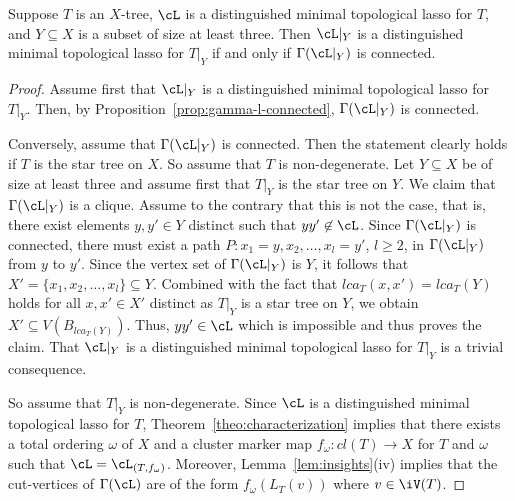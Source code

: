 \begin{thm}
  \label{theo:subtree}
  Suppose $T$ is an $X$-tree, $\cL$ is a distinguished minimal topological
  lasso for $T$, and $Y\subseteq X$ is a subset of size at least three. Then
  $\cL|_Y$ is a distinguished minimal topological lasso for $T|_Y$ if and only
  if $\Gamma(\cL|_Y)$ is connected.
\end{thm}
\begin{proof}
  Assume first that $\cL|_Y$ is a distinguished minimal topological lasso for
  $T|_Y$. Then, by Proposition~\ref{prop:gamma-l-connected}, $\Gamma(\cL|_Y)$
  is connected.

  Conversely, assume that $\Gamma(\cL|_Y)$ is connected. Then the statement
  clearly holds if $T$ is the star tree on $X$. So assume that $T$ is
  non-degenerate. Let $Y\subseteq X$ be of size at least three and assume
  first that $T|_Y$ is the star tree on $Y$. We claim that $\Gamma(\cL|_Y)$ is
  a clique. Assume to the contrary that this is not the case, that is, there
  exist elements $y,y'\in Y$ distinct such that $yy'\not\in \cL$. Since
  $\Gamma(\cL|_Y)$ is connected, there must exist a path
  $P:x_1=y,x_2,\ldots,x_l=y'$, $l\geq 2$, in $\Gamma(\cL|_Y)$ from $y$ to
  $y'$. Since the vertex set of $\Gamma(\cL|_Y)$ is $Y$, it follows that
  $X'=\{x_1,x_2,\ldots,x_l\}\subseteq Y$. Combined with the fact that
  $lca_T(x,x')=lca_T(Y)$ holds for all $x,x'\in X'$ distinct as $T|_Y$ is a
  star tree on $Y$, we obtain $X'\subseteq V(B_{lca_T(Y)})$.  Thus, $yy'\in
  \cL$ which is impossible and thus proves the claim.  That $\cL|_Y$ is a
  distinguished minimal topological lasso for $T|_Y$ is a trivial consequence.

  So assume that $T|_Y$ is non-degenerate. Since $\cL$ is a distinguished
  minimal topological lasso for $T$, Theorem~\ref{theo:characterization}
  implies that there exists a total ordering $\omega$ of $X$ and a cluster
  marker map $f_{\omega}: cl(T)\to X$ for $T$ and $\omega$ such that
  $\cL=\cL_{(T,f_{\omega})}$. Moreover, Lemma~\ref{lem:insights}(iv) implies
  that the cut-vertices of $\Gamma(\cL)$ are of the form $f_{\omega}(L_T(v))$
  where $v\in \iV(T)$.


\end{proof}
